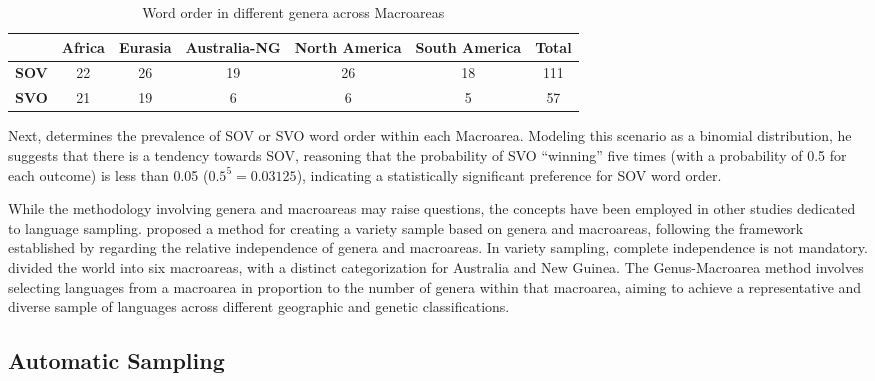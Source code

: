 \begin{table}[ht]
	\centering
	\begin{tabular}{@{}ccccccc@{}}
		\toprule
		\multicolumn{1}{l}{} & \textbf{Africa} & \textbf{Eurasia} & \textbf{Australia-NG} & \textbf{North America} & \textbf{South America} & \textbf{Total} \\ \midrule
		\textbf{SOV}         & 22              & 26               & 19                    & 26                     & 18                     & 111            \\
		\textbf{SVO}         & 21              & 19               & 6                     & 6                      & 5                      & 57             \\ \bottomrule
	\end{tabular}
	\caption{Word order in different genera across Macroareas}\label{dryer_table}
\end{table}

Next, \citet{dryer1989large} determines the prevalence of SOV or SVO word order within each Macroarea. Modeling this scenario as a binomial distribution, he suggests that there is a tendency towards SOV, reasoning that the probability of SVO ``winning'' five times (with a probability of 0.5 for each outcome) is less than 0.05 ($0.5^5 = 0.03125$), indicating a statistically significant preference for SOV word order.

While the methodology involving genera and macroareas may raise questions, the concepts have been employed in other studies dedicated to language sampling. \citet{miestamo2016sampling} proposed a method for creating a variety sample based on genera and macroareas, following the framework established by \citet{dryer1989large} regarding the relative independence of genera and macroareas. In variety sampling, complete independence is not mandatory. \citet{miestamo2016sampling} divided the world into six macroareas, with a distinct categorization for Australia and New Guinea. The Genus-Macroarea method involves selecting languages from a macroarea in proportion to the number of genera within that macroarea, aiming to achieve a representative and diverse sample of languages across different geographic and genetic classifications.

\subsection{Automatic Sampling}

